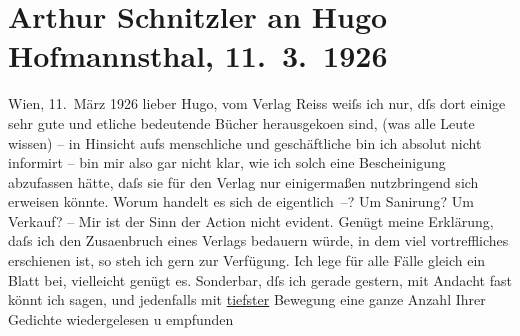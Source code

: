 

         
         \renewcommand{\erwaehntePersonen}{Personen: Lili Cappellini, Hugo von Hofmannsthal}
         \renewcommand{\erwaehnteInstitutionen}{Institutionen: Erich-Reiss-Verlag}
         \renewcommand{\erwaehnteOrte}{Orte: Wien}
         \renewcommand{\erwaehnteWerke}{}
               \section[Arthur Schnitzler an Hugo Hofmannsthal, 11. 3. 1926]{ Arthur Schnitzler an Hugo Hofmannsthal, 11. 3. 1926}\nopagebreak{}\rehead{ }\begin{ledgroupsized}[t]{13cm}\normalsize\beginnumbering{} \toendnotes[C]{\smallbreak\pagebreak[2]} 
\pstart
           \raggedleft{}{\pb}Wien, 11. März 1926\pend
           \pstart
           lieber Hugo, vom Verlag Reiss
               weiſs ich nur, dſs dort einige sehr gute und etliche bedeutende Bücher herausgeko{\geminationm}en sind, (was alle Leute wissen) – \introOben{}in Hinsicht aufs\introOben{} menschliche und geschäftliche bin ich absolut nicht
               informirt – bin mir also gar nicht klar, wie ich solch eine Bescheinigung abzufassen
               hätte, daſs sie für den Verlag nur einigermaßen nutzbringend sich erweisen könnte.
               Worum handelt es sich de{\geminationn} eigentlich –? Um Sanirung? Um
               Verkauf? – Mir ist der Sinn der Action nicht evident. Genügt meine Erklärung, daſs
               ich den Zusa{\geminationm}enbruch eines Verlags bedauern würde, in
               dem viel vortreffliches erschienen ist, so steh ich gern zur Verfügung. Ich lege für
               alle Fälle gleich ein Blatt bei, vielleicht genügt es.\pend
           \pstart
           {\pb}Sonderbar, dſs ich gerade gestern, mit Andacht fast
               könnt ich sagen, und jedenfalls mit \uline{tiefster} Bewegung
               eine ganze Anzahl Ihrer Gedichte \introOben{}wieder\introOben{}gelesen u empfunden

\end{ledgroupsized}
